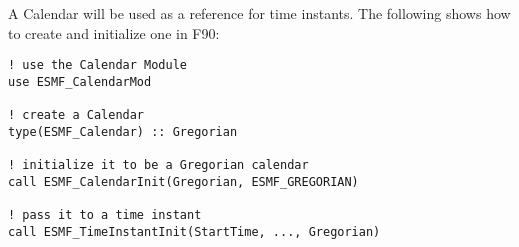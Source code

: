 
A Calendar will be used as a reference for time instants.
The following shows how to create and initialize one in F90:

\begin{verbatim}
! use the Calendar Module
use ESMF_CalendarMod

! create a Calendar
type(ESMF_Calendar) :: Gregorian

! initialize it to be a Gregorian calendar
call ESMF_CalendarInit(Gregorian, ESMF_GREGORIAN)

! pass it to a time instant
call ESMF_TimeInstantInit(StartTime, ..., Gregorian)
\end{verbatim}
